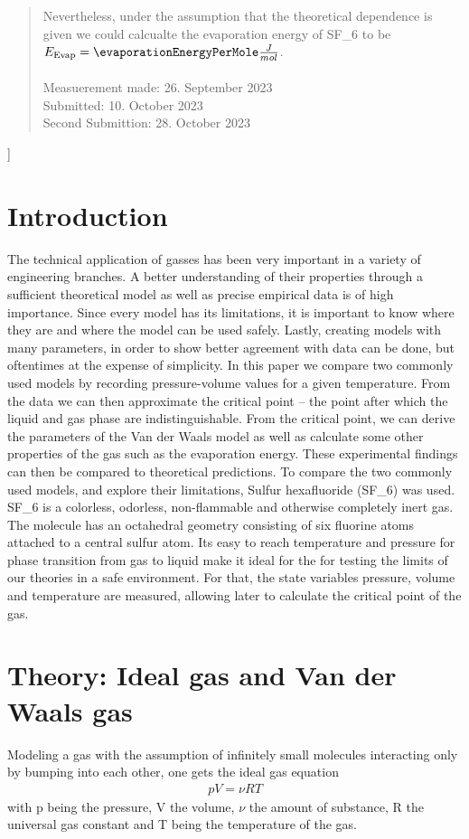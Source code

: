 \documentclass[a4paper,10pt,twocolumn]{article}
\begin{document}
{\begin{abstract}
       Nevertheless, under the assumption that the theoretical dependence is given we could calcualte the evaporation energy of SF_6\) to be $E_{\text{Evap}}=\evaporationEnergyPerMole \frac{J}{mol}$.
       \\
       \\
        Measuerement made: 26. September 2023\\       %
        Submitted: 10. October 2023  \\
        Second Submittion: 28. October 2023%
        \\
    \end{abstract}
    }]
    \section{Introduction}\label{sec:introdction}
    The technical application of gasses has been very important in a variety of engineering branches. 
    A better understanding of their properties through a sufficient theoretical model as well as precise empirical data is of high importance.
    Since every model has its limitations, it is important to know where they are and where the model can be used safely.
    Lastly, creating models with many parameters, in order to show better agreement with data can be done, but oftentimes at the expense of simplicity.
    In this paper we compare two commonly used models by recording pressure-volume values for a given temperature.
    From the data we can then approximate the critical point -- the point after which the liquid and gas phase are indistinguishable.
    From the critical point, we can derive the parameters of the Van der Waals model as well as calculate some other properties of the gas such as the evaporation energy.
    These experimental findings can then be compared to theoretical predictions.
    To compare the two commonly used models, and explore their limitations, Sulfur hexafluoride (SF_6\)) was used.
    SF_6\) is a colorless, odorless, non-flammable and otherwise completely inert gas. 
    The molecule has an octahedral geometry consisting of six fluorine atoms attached to a central sulfur atom.
    Its easy to reach temperature and pressure for phase transition from gas to liquid make it ideal for the for testing the limits of our theories in a safe environment.
    For that, the state variables pressure, volume and temperature are measured, allowing later to calculate the critical point of the gas.
    \section{Theory: Ideal gas and Van der Waals gas}\label{sec:theory}
    Modeling a gas with the assumption of infinitely small molecules interacting only by bumping into each other, one gets the ideal gas equation
    \begin{align}
        pV=\nu RT
    \end{align}
    with p being the pressure, V the volume, $\nu$ the amount of substance, R the universal gas constant and T being the temperature of the gas.
    
\end{document}
